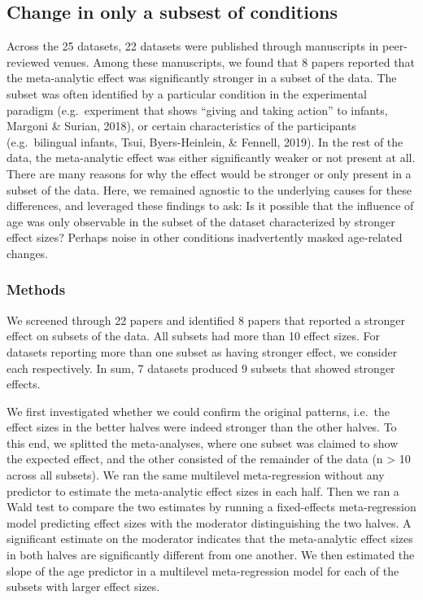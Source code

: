 \documentclass[
  man]{apa6}
\begin{document}
\hypertarget{change-in-only-a-subsest-of-conditions}{%
\subsection{Change in only a subsest of conditions}\label{change-in-only-a-subsest-of-conditions}}

Across the 25 datasets, 22 datasets were published through manuscripts in peer-reviewed venues. Among these manuscripts, we found that 8 papers reported that the meta-analytic effect was significantly stronger in a subset of the data. The subset was often identified by a particular condition in the experimental paradigm (e.g.~experiment that shows ``giving and taking action'' to infants, Margoni \& Surian, 2018), or certain characteristics of the participants (e.g.~bilingual infants, Tsui, Byers-Heinlein, \& Fennell, 2019). In the rest of the data, the meta-analytic effect was either significantly weaker or not present at all. There are many reasons for why the effect would be stronger or only present in a subset of the data. Here, we remained agnostic to the underlying causes for these differences, and leveraged these findings to ask: Is it possible that the influence of age was only observable in the subset of the dataset characterized by stronger effect sizes? Perhaps noise in other conditions inadvertently masked age-related changes.

\hypertarget{methods-3}{%
\subsubsection{Methods}\label{methods-3}}

We screened through 22 papers and identified 8 papers that reported a stronger effect on subsets of the data. All subsets had more than 10 effect sizes. For datasets reporting more than one subset as having stronger effect, we consider each respectively. In sum, 7 datasets produced 9 subsets that showed stronger effects.

We first investigated whether we could confirm the original patterns, i.e.~the effect sizes in the better halves were indeed stronger than the other halves. To this end, we splitted the meta-analyses, where one subset was claimed to show the expected effect, and the other consisted of the remainder of the data (n \textgreater{} 10 across all subsets). We ran the same multilevel meta-regression without any predictor to estimate the meta-analytic effect sizes in each half. Then we ran a Wald test to compare the two estimates by running a fixed-effects meta-regression model predicting effect sizes with the moderator distinguishing the two halves. A significant estimate on the moderator indicates that the meta-analytic effect sizes in both halves are significantly different from one another. We then estimated the slope of the age predictor in a multilevel meta-regression model for each of the subsets with larger effect sizes.
\end{document}
